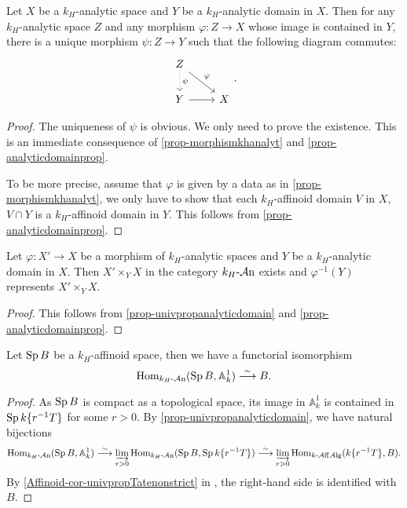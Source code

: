 \begin{proposition}\label{prop-univpropanalyticdomain}
    Let $X$ be a $k_H$-analytic space and $Y$ be a $k_H$-analytic domain in $X$. Then for any $k_H$-analytic space $Z$ and any morphism $\varphi:Z\rightarrow X$ whose image is contained in $Y$, there is a unique morphism $\psi:Z\rightarrow Y$ such that the following diagram commutes:
    \[
        \begin{tikzcd}
            Z \arrow[d, "\psi", dotted] \arrow[rd, "\varphi"] &   \\
            Y \arrow[r]                                       & X
        \end{tikzcd}.  
    \]
\end{proposition}
\begin{proof}
    The uniqueness of $\psi$ is obvious. We only need to prove the existence. 
    This is an immediate consequence of \cref{prop-morphismkhanalyt} and \cref{prop-analyticdomainprop}.

    To be more precise, assume that $\varphi$ is given by a data as in \cref{prop-morphismkhanalyt}, we only have to show that each $k_H$-affinoid domain $V$ in $X$, $V\cap Y$ is a $k_H$-affinoid domain in $Y$. This follows from \cref{prop-analyticdomainprop}.
\end{proof}

\begin{corollary}\label{cor-fiberprodanalyticdomain}
    Let $\varphi:X'\rightarrow X$ be a morphism of $k_H$-analytic spaces and $Y$ be a $k_H$-analytic domain in $X$. Then $X'\times_Y X$ in the category $k_H\text{-}\mathcal{A}\mathrm{n}$ exists and
    $\varphi^{-1}(Y)$ represents $X'\times_Y X$.
\end{corollary}
\begin{proof}
    This follows from \cref{prop-univpropanalyticdomain} and \cref{prop-analyticdomainprop}.    
\end{proof}

\begin{corollary}\label{cor-A1ringed}
    Let $\operatorname{Sp} B$ be a  $k_H$-affinoid space, then we have a functorial isomorphism
    \[
        \operatorname{Hom}_{k_H\text{-}\mathcal{A}\mathrm{n}}(\operatorname{Sp} B,\mathbb{A}^1_k)\stackrel{\sim}{\longrightarrow} B. 
    \]
\end{corollary}
\begin{proof}
    As $\operatorname{Sp} B$ is compact as a topological space, its image in $\mathbb{A}^1_k$ is contained in $\operatorname{Sp} k\{r^{-1}T\}$ for some $r>0$.  By \cref{prop-univpropanalyticdomain}, we have natural bijections
    \[
        \operatorname{Hom}_{k_H\text{-}\mathcal{A}\mathrm{n}}(\operatorname{Sp} B,\mathbb{A}^1_k)\stackrel{\sim}{\longrightarrow} \varinjlim_{r>0}\operatorname{Hom}_{k_H\text{-}\mathcal{A}\mathrm{n}}(\operatorname{Sp} B,\operatorname{Sp} k\{r^{-1}T\})\stackrel{\sim}{\longrightarrow}  \varinjlim_{r>0}\operatorname{Hom}_{k\text{-}\mathcal{A}\mathrm{ff}\mathcal{A}\mathrm{lg}}(k\{r^{-1}T\}, B).  
    \]
    By \cref{Affinoid-cor-univpropTatenonstrict} in , the right-hand side is identified with $B$.
\end{proof}

